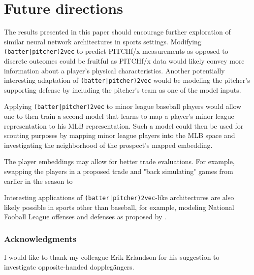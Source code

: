 \documentclass{article}
\begin{document}
\section{Future directions}
\label{future}

The results presented in this paper should encourage further exploration of similar neural network architectures in sports settings. Modifying \texttt{(batter|pitcher)2vec} to predict PITCHf/x measurements as opposed to discrete outcomes could be fruitful as PITCHf/x data would likely convey more information about a player's physical characteristics. Another potentially interesting adaptation of \texttt{(batter|pitcher)2vec} would be modeling the pitcher's supporting defense by including the pitcher's team as one of the model inputs.

Applying \texttt{(batter|pitcher)2vec} to minor league baseball players would allow one to then train a second model that learns to map a player's minor league representation to his MLB representation. Such a model could then be used for scouting purposes by mapping minor league players into the MLB space and investigating the neighborhood of the prospect's mapped embedding.

The player embeddings may allow for better trade evaluations. For example, swapping the players in a proposed trade and "back simulating" games from earlier in the season to 

Interesting applications of \texttt{(batter|pitcher)2vec}-like architectures are also likely possible in sports other than baseball, for example, modeling National Fooball League offenses and defenses as proposed by \parencite{Alcorn2016}.

\subsubsection*{Acknowledgments}

I would like to thank my colleague Erik Erlandson for his suggestion to investigate opposite-handed dopplegängers.

\printbibliography
\end{document}
